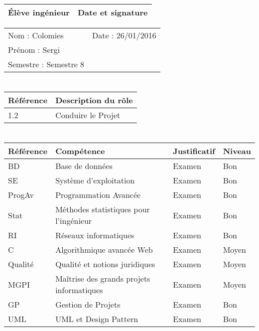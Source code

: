 \documentclass[11pt]{article}
\begin{document}

\begin{center}
\begin{table}[!hp]

	\begin{tabularx}{\linewidth}{|X|X|}
	\hline
	\rowcolor{gray!40} Élève ingénieur & Date et signature \\
	\hline
	\end{tabularx}
	\begin{tabularx}{\linewidth}{|X|X|}
	Nom : Colomies & Date : 26/01/2016 \\ 
	Prénom : Sergi & \\
	Semestre : Semestre 8 & \\
	\hline
	\end{tabularx}
\end{table}
\end{center}

\section*{\large\FR}

\centering
	\begin{longtable}{|p{4cm}|p{4cm}|}
	\hline
	\rowcolor{gray!40} Référence \WBSCourt & Description du rôle \\
	\hline
	 1.2 & Conduire le Projet \\
	 \hline
	\end{longtable}


\section*{\large\FC}

\centering
	\begin{longtable}{|p{3cm}|p{3cm}|p{3cm}|p{3cm}|}
	\hline
	\rowcolor{gray!40} Référence & Compétence & Justificatif & Niveau \\
	\hline
	 BD & Base de données & Examen & Bon \\
	 \hline
	  SE & Système d'exploitation & Examen & Bon\\
	  \hline
	  ProgAv & Programmation Avancée & Examen & Bon\\
	  \hline
	  Stat & Méthodes statistiques pour l'ingénieur & Examen & Bon \\ 
	  \hline
	  RI & Réseaux informatiques & Examen & Bon \\
	  \hline
	  C & Algorithmique avancée Web & Examen & Moyen \\
	  \hline
	  Qualité & Qualité et notions juridiques & Examen & Moyen \\
	  \hline
	  MGPI & Maîtrise des grands projets informatiques & Examen & Moyen \\
	  \hline
	  GP & Gestion de Projets & Examen & Bon \\
	  \hline
	  UML & UML et Design Pattern & Examen & Bon \\
	  \hline
	\end{longtable}
\end{document}
